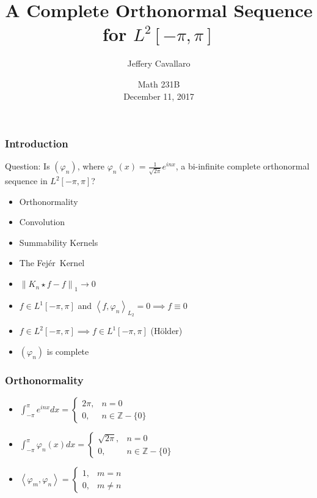 \documentclass[xcolor=dvipsnames]{beamer}
\theoremstyle{definition}
\newcommand{\Z}{\mathbb{Z}}
\providecommand{\norm}[1]{\left\lVert#1\right\rVert}       %
\newcommand{\vp}{\varphi}
\newcommand{\Lop}{L^1[-\pi,\pi]}
\newcommand{\Ltp}{L^2[-\pi,\pi]}
\newcommand{\Fej}{Fej\'{e}r\ }
\newcommand{\inner}[1]{\left<#1\right>}
\begin{document}
\raggedright

\title{A Complete Orthonormal Sequence for $\Ltp$}
\author{Jeffery Cavallaro}

\date{Math 231B \\ December 11, 2017}

\begin{frame}

\titlepage

\end{frame}

\begin{frame}
  \frametitle{Introduction}

  Question: Is $(\vp_n)$, where $\vp_n(x)=\frac{1}{\sqrt{2\pi}}e^{inx}$, a
  bi-infinite complete orthonormal sequence in $\Ltp$?

  \begin{itemize}

  \item Orthonormality
  \item Convolution
  \item Summability Kernels
  \item The \Fej Kernel
  \item $\norm{K_n\star f-f}_1\to0$
  \item $f\in\Lop$ and $\inner{f,\vp_n}_{L_2}=0\implies f\equiv0$
  \item $f\in\Ltp\implies f\in\Lop$ (H\"{o}lder)
  \item $(\vp_n)$ is complete
  \end{itemize}

\end{frame}



\begin{frame}
  \frametitle{Orthonormality}

  \begin{itemize}

  \item $\int_{-\pi}^{\pi}e^{inx}dx=\begin{cases}
  2\pi, & n=0 \\
  0, & n\in\Z-\{0\}
  \end{cases}$

  \item $\int_{-\pi}^{\pi}\vp_n(x)dx=\begin{cases}
  \sqrt{2\pi}, & n=0 \\
  0, & n\in\Z-\{0\}
  \end{cases}$

  \item $\inner{\vp_m,\vp_n}=\begin{cases}
  1, & m=n \\
  0, & m\ne n
  \end{cases}$

  \end{itemize}
  
\end{frame}
\end{document}
